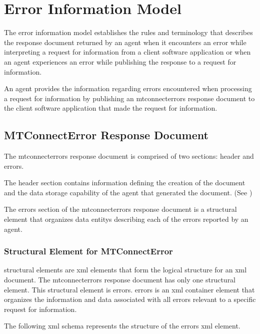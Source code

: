 \section{Error Information Model}
\label{sec:Error Information Model}

The \gls{error information model} establishes the rules and terminology that describes the \gls{response document} returned by an \gls{agent} when it encounters an error while interpreting a \gls{request} for information from a client software application or when an \gls{agent} experiences an error while publishing the \gls{response} to a \gls{request} for information.      

An \gls{agent} provides the information regarding errors encountered when processing a \gls{request} for information by publishing an \gls{mtconnecterrors response document} to the client software application that made the \gls{request} for information.

\subsection{MTConnectError Response Document}

The \gls{mtconnecterrors response document} is comprised of two sections: \gls{header} and \gls{errors}.

The \gls{header} section contains information defining the creation of the document and the data storage capability of the \gls{agent} that generated the document.  (See )

The \gls{errors} section of the \gls{mtconnecterrors response document} is a \gls{structural element} that organizes \glspl{data entity} describing each of the errors reported by an \gls{agent}.   

\subsubsection{Structural Element for MTConnectError}

\glspl{structural element} are \gls{xml} elements that form the logical structure for an \gls{xml} document.  The \gls{mtconnecterrors response document} has only one \gls{structural element}.  This \gls{structural element} is \gls{errors}.   \gls{errors} is an \gls{xml} container element that organizes the information and data associated with all errors relevant to a specific \gls{request} for information.

The following \gls{xml schema} represents the structure of the \gls{errors} \gls{xml} element.   

